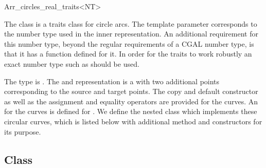 
\ccRefPageBegin

\begin{ccRefClass}{Arr_circles_real_traits<NT>}

\ccDefinition
    The class  is a traits class
    for circle arcs. The template parameter  corresponds to
    the number type used in the inner representation. An additional requirement
    for this number type, beyond the regular requirements of
    a CGAL number type, is that it has
    a  function defined for it. In order for the traits
    to work robustly an exact number type such as  should
    be used.

    The  type is . The  
     and 
    representation is a 
    with two additional points corresponding to the source and target points.
    The copy and default constructor as well as the
    assignment and equality operators are provided for the curves. 
    An  for the curves is defined for
    .
    We define the nested class  which implements these 
    circular curves, which is listed below with additional method and 
    constructors for its purpose.



\ccIsModel
     

\subsection*{Class }


\end{ccRefClass}
